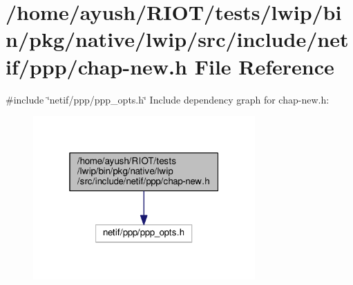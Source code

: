 \hypertarget{native_2lwip_2src_2include_2netif_2ppp_2chap-new_8h}{}\section{/home/ayush/\+R\+I\+O\+T/tests/lwip/bin/pkg/native/lwip/src/include/netif/ppp/chap-\/new.h File Reference}
\label{native_2lwip_2src_2include_2netif_2ppp_2chap-new_8h}
{\ttfamily \#include \char`\"{}netif/ppp/ppp\+\_\+opts.\+h\char`\"{}}\newline
Include dependency graph for chap-\/new.h\+:
\nopagebreak
\begin{figure}[H]
\begin{center}
\leavevmode
\includegraphics[width=241pt]{native_2lwip_2src_2include_2netif_2ppp_2chap-new_8h__incl}
\end{center}
\end{figure}
